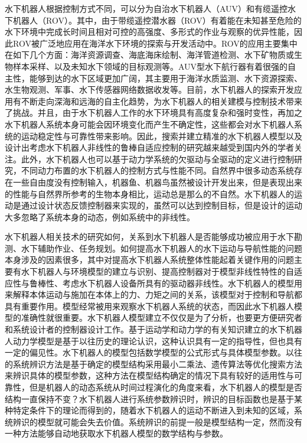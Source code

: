 水下机器人根据控制方式不同，可以分为自治水下机器人（AUV）和有缆遥控水下机器人（ROV）。其中，由于带缆遥控潜水器（ROV）有着能在未知甚至危险的水下环境中完成长时间且相对可控的高强度、多形式的作业与观察的优异性能，因此ROV被广泛地应用在海洋水下环境的探索与开发活动中。ROV的应用主要集中在如下几个方面：海洋资源调查、海底海床绘制、海洋管道检测、水下矿物质或生物样本采样、以及未知水下领域的目标观测等\cite{follestad2017autonomous,aguiar2007dynamic}。AUV型水下航行器有着很强的自主性，能够到达的水下区域更加广阔，其主要用于海洋水质监测、水下资源探索、水生物观测、军事、水下传感器网络数据收发等\cite{maalouf2013contribution}。目前，水下机器人的探索开发应用有不断走向深海和远海的自主化趋势，为水下机器人的相关建模与控制技术带来了挑战\cite{wangbiao2016,yangke2014,yangrui2015,aakre2016development}。并且，由于水下机器人工作的水下环境具有高度复杂和强时变性，再加之水下机器人系统本身可能会因环境变化而产生不确定性，这些都会对水下机器人系统的运动稳定性与可靠性带来影响。因此，搜索并建立精准的水下机器人模型以及设计出考虑水下机器人非线性的鲁棒自适应控制的研究越来越受到国内外的学者关注\cite{yang2014modeling,haugen2012modeling,knausgaard2013development,eidsvik2015identification,eng2014added}。此外，水下机器人也可以基于动力学系统的欠驱动与全驱动的定义进行控制研究，不同动力布置的水下机器人的控制方式与性能不同\cite{fantoni2002non,russdrakebook}。自然界中很多动态系统存在一些自由度没有控制输入，机器鱼、机器鸟虽然被设计开发出来，但是表现出来的性能与自然界所参考的生物本身相比，运动总是那么的不自然\cite{russdrakebook}。水下机器人的运动是通过设计状态反馈控制器来实现的，虽然可以达到控制目标，但是设计的运动大多忽略了系统本身的动态，例如系统中的非线性\cite{russdrakebook,galeani2009tutorial}。

水下机器人相关技术的研究如何，关系到水下机器人是否能够成功被应用于水下勘测、水下辅助作业、任务规划\cite{Souza2007Intelligent}。如何提高水下机器人的水下运动与导航性能的问题本身涉及的因素很多，其中对提高水下机器人系统整体性能起着关键作用的问题主要有水下机器人与环境模型的建立与识别、提高控制器对于模型非线性特性的自适应性与鲁棒性、考虑水下机器人设备所具有的驱动器非线性\cite{yang2012observer,sarhadi2016adaptive2}。水下机器人的模型用来解释本体运动与施加在本体上的力、力矩之间的关系，该模型对于控制和导航都具有重要作用\cite{wu2016parametric}。模型经常被用来观察水下机器人系统的状态，而因此水下机器人模型的准确性就很重要。水下机器人模型建立不仅仅是为了分析，也要更方便研究者和系统设计者的控制器设计工作。基于运动学和动力学的有关知识建立的水下机器人动力学模型是基于以往历史的理论认识，这种认识具有一定的指导性，但也具有一定的偏见性\cite{menezes2014symbolic}。水下机器人的模型包括数学模型的公式形式与具体模型参数\cite{schmidt2009distilling}。以往的系统辨识方法是基于确定的模型结构采用最小二乘法、遗传算法等优化搜索方法来辨识具体的模型参数，这种方法在模型结构确定的情况下具有较好的适用性与可靠性，但是机器人的动态系统从时间过程演化的角度来看，水下机器人的模型是否结构一直保持不变\cite{John1978Methods}？水下机器人进行系统参数辨识时，辨识的目标函数也是基于某种特定条件下的理论而得到的，随着水下机器人的运动不断进入到未知的区域，系统辨识的模型就可能会失去价值。系统辨识的前提一般是模型结构一定，然而没有一种方法能够自动地获取水下机器人模型的数学结构与参数\cite{wu2016parametric}。

